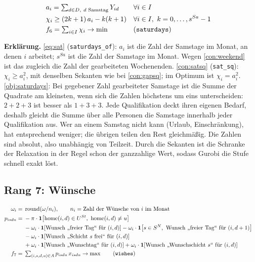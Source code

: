 \documentclass[11pt]{combiArticle}
\newcommand{\ind}[1]{\mathbf{1}\!\left[#1\right]}
\newcommand{\code}[1]{\texttt{#1}}
\begin{document}
\begin{align}
  & a_i = \textstyle\sum_{d \in D,\ d \text{ Samstag}} Y_{id} && \forall i \in I \label{eq:sat}\\
  & \chi_i \ge (2k+1)\, a_i - k(k+1) && \forall i \in I,\ k = 0,\dots,s^{Sa}-1 \label{con:satsq}\\
  & f_6 = \textstyle\sum_{i \in I} \chi_i \to \min && \text{(\code{saturdays})} \label{obj:saturdays}
\end{align}

\textbf{Erklärung.}
\eqref{eq:sat} (\code{saturdays\_of}): $a_i$ ist die Zahl der Samstage im Monat, an denen $i$ arbeitet; $s^{Sa}$ ist
die Zahl der Samstage im Monat. Wegen \eqref{con:weekend} ist das zugleich die Zahl der gearbeiteten Wochenenden.
\eqref{con:satsq} (\code{sat\_sq}): $\chi_i \ge a_i^2$, mit denselben Sekanten wie bei \eqref{con:gapsq}; im Optimum
ist $\chi_i = a_i^2$.
\eqref{obj:saturdays}: Bei gegebener Zahl gearbeiteter Samstage ist die Summe der Quadrate am kleinsten, wenn sich die
Zahlen höchstens um eins unterscheiden: $2+2+3$ ist besser als $1+3+3$. Jede Qualifikation deckt ihren eigenen
Bedarf, deshalb gleicht die Summe über alle Personen die Samstage innerhalb jeder Qualifikation aus. Wer an einem
Samstag nicht kann (Urlaub, Einschränkung), hat entsprechend weniger; die übrigen teilen den Rest gleichmäßig. Die
Zahlen sind absolut, also unabhängig von Teilzeit. Durch die Sekanten ist die Schranke der Relaxation in der Regel
schon der ganzzahlige Wert, sodass Gurobi die Stufe schnell exakt löst.

\subsection{Rang 7: Wünsche}\label{sec:z:wuensche}

\begin{align}
  \omega_i = {} & \operatorname{round}(\omega / n_i),\qquad n_i = \text{Zahl der Wünsche von } i \text{ im Monat}
                 \label{par:omega}\\
  p_{isdu} = {} & - \pi \cdot \ind{\operatorname{home}(i,d) \in U^{St},\ \operatorname{home}(i,d) \neq u}
                 \label{par:p}\\
  & - \omega_i \cdot \ind{\text{Wunsch „freier Tag“ für } (i,d)}
    - \omega_i \cdot \ind{s \in S^{N},\ \text{Wunsch „freier Tag“ für } (i,d+1)} \notag\\
  & - \omega_i \cdot \ind{\text{Wunsch „Schicht } s \text{ frei“ für } (i,d)} \notag\\
  & + \omega_i \cdot \ind{\text{Wunsch „Wunschtag“ für } (i,d)}
    + \omega_i \cdot \ind{\text{Wunsch „Wunschschicht } s\text{“ für } (i,d)} \notag\\
  f_7 = {} & \textstyle\sum_{(i,s,d,u) \in A} p_{isdu}\, x_{isdu} \to \max \qquad \text{(\code{wishes})} \label{obj:wishes}
\end{align}
\end{document}
